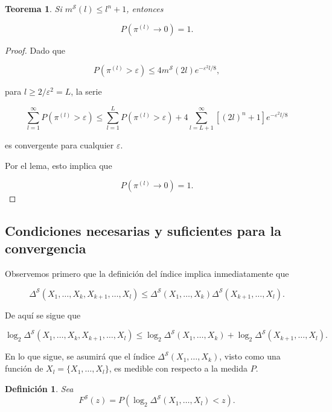 \documentclass{article}
\newtheorem{thm}{Teorema}[subsection]
\newtheorem{dfn}{Definición}[subsection]
\begin{document}
\begin{thm}
    Si \( m^{\mathcal{S}}(l) \leq l^n + 1 \), entonces  

    \[
    P(\pi^{(l)} \to 0) = 1.
    \]
    
\end{thm} 

\begin{proof}

Dado que  

\[
P(\pi^{(l)} > \varepsilon) \leq 4 m^{\mathcal{S}}(2l)  e^{-\varepsilon^2 l/8},
\]

para \( l \geq 2 / \varepsilon^2 =L \), la serie  

\[
\sum_{l=1}^{\infty} P(\pi^{(l)} > \varepsilon) \leq \sum_{l=1}^{L} P(\pi^{(l)} > \varepsilon) + 4 \sum_{l=L+1}^{\infty} [(2l)^n + 1] e^{-\varepsilon^2 l/8}
\]

es convergente para cualquier \( \varepsilon \).  

Por el lema, esto implica que  

\[
P(\pi^{(l)} \to 0) = 1.
\]
\end{proof}

\subsection{Condiciones necesarias y suficientes para la convergencia}

Observemos primero que la definición del índice implica inmediatamente que  

\begin{equation*}
\Delta^{\mathcal{S}}(X_1, \dots, X_{k}, X_{k+1}, \dots,X_l) \leq \Delta^{\mathcal{S}}(X_1, \dots, X_k) \Delta^{\mathcal{S}}(X_{k+1}, \dots, X_l).
\end{equation*}

De aquí se sigue que  

\begin{equation*}
\log_2 \Delta^{\mathcal{S}}(X_1, \dots, X_{k}, X_{k+1}, \dots,X_l) \leq \log_2 \Delta^{\mathcal{S}}(X_1, \dots, X_k) + \log_2 \Delta^{\mathcal{S}}(X_{k+1}, \dots, X_l).
\end{equation*}

En lo que sigue, se asumirá que el índice \( \Delta^{\mathcal{S}}(X_1, \dots, X_k) \), visto como una función de 
\( X_l = \{X_1, \dots, X_l\} \), es medible con respecto a la medida \( P \).\newline

\begin{dfn}
    Sea  
    \[
    F^{\mathcal{S}}(z) = P\left(\log_2 \Delta^{\mathcal{S}}(X_1, \dots, X_l) < z \right).
    \]
\end{dfn}
    
\end{document}
